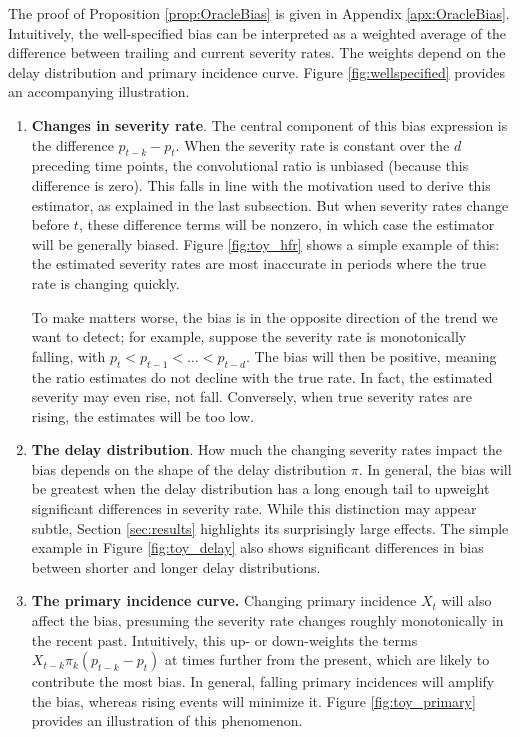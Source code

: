 \documentclass{article}
\begin{document}
The proof of Proposition \ref{prop:OracleBias} is given in
Appendix \ref{apx:OracleBias}. 
Intuitively, the well-specified bias can be interpreted as a weighted average of the difference between trailing and current severity rates. 
The weights depend on the delay distribution and primary incidence curve.
Figure \ref{fig:wellspecified} provides an accompanying illustration.     

\begin{enumerate}
\item \textbf{Changes in severity rate}. The central component of this bias
  expression is the difference $p_{t-k}-p_t$. When the severity rate is constant
  over the $d$ preceding time points, the convolutional ratio is unbiased 
  (because this difference is zero). This falls in line with the motivation used
  to derive this estimator, as explained in the last subsection. But when 
  severity rates change before $t$, these difference terms will be nonzero, in
  which case the estimator will be generally biased. %
  Figure \ref{fig:toy_hfr} shows a simple example of this: the estimated
  severity rates are most inaccurate in periods where the true rate is changing
  quickly.        

  To make matters worse, the bias is in the opposite direction of the trend we 
  want to detect; for example, suppose the severity rate is monotonically
  falling, with $p_t < p_{t-1} < \dots < p_{t-d}$. The bias will then be
  positive, meaning the ratio estimates do not decline with the true rate. In
  fact, the estimated severity may even rise, not fall. Conversely, when true
  severity rates are rising, the estimates will be too low. 

\item \textbf{The delay distribution}. How much the changing severity rates
  impact the bias depends on the shape of the delay distribution $\pi$. In
  general, the bias will be greatest when the delay distribution has a long
  enough tail to upweight significant differences in severity rate. While this
  distinction may appear subtle, Section \ref{sec:results} highlights its
  surprisingly large effects. The simple example in Figure \ref{fig:toy_delay}
  also shows significant differences in bias between shorter and longer delay
  distributions.     

\item \textbf{The primary incidence curve.} Changing primary incidence $X_t$ 
  will also affect the bias, presuming the severity rate changes roughly 
  monotonically in the recent past. Intuitively, this up- or down-weights the
  terms $X_{t-k}\pi_k (p_{t-k} - p_t)$ at times further from the present, which  
  are likely to contribute the most bias. In general, falling primary incidences
  will amplify the bias, whereas rising events will minimize it. Figure
  \ref{fig:toy_primary} provides an illustration of this phenomenon.   
\end{enumerate}
\end{document}
